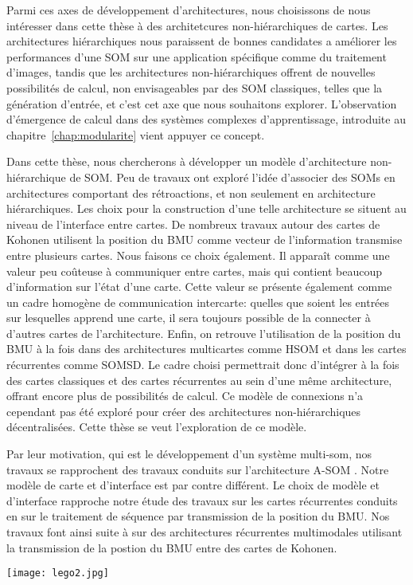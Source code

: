 \documentclass[../main]{subfiles}
\begin{document}
Parmi ces axes de développement d'architectures, nous choisissons de nous intéresser dans cette thèse à des architetcures non-hiérarchiques de cartes.
Les architectures hiérarchiques nous paraissent de bonnes candidates a améliorer les performances d'une SOM sur une application spécifique comme du traitement d'images, tandis que les architectures non-hiérarchiques offrent de nouvelles possibilités de calcul, non envisageables par des SOM classiques, telles que la génération d'entrée, et c'est cet axe que nous souhaitons explorer. L'observation d'émergence de calcul dans des systèmes complexes d'apprentissage, introduite au chapitre~\ref{chap:modularite} vient appuyer ce concept.

Dans cette thèse, nous chercherons à développer un modèle d'architecture non-hiérarchique de SOM. Peu de travaux ont exploré l'idée d'associer des SOMs en architectures comportant des rétroactions, et non seulement en architecture hiérarchiques.
Les choix pour la construction d'une telle architecture se situent au niveau de l'interface entre cartes. De nombreux travaux autour des cartes de Kohonen utilisent la position du BMU comme vecteur de l'information transmise entre plusieurs cartes. 
Nous faisons ce choix également. Il apparaît comme une valeur peu coûteuse à communiquer entre cartes, mais qui contient beaucoup d'information sur l'état d'une carte. Cette valeur se présente également comme un cadre homogène de communication intercarte: quelles que soient les entrées sur lesquelles apprend une carte, il sera toujours possible de la connecter à d'autres cartes de l'architecture. 
Enfin, on retrouve l'utilisation de la position du BMU à la fois dans des architectures multicartes comme HSOM et dans les cartes récurrentes comme SOMSD. Le cadre choisi permettrait donc d'intégrer à la fois des cartes classiques et des cartes récurrentes au sein d'une même architecture, offrant encore plus de possibilités de calcul.
Ce modèle de connexions n'a cependant pas été exploré pour créer des architectures non-hiérarchiques décentralisées. Cette thèse se veut l'exploration de ce modèle.

Par leur motivation, qui est le développement d'un système multi-som, nos travaux se rapprochent des travaux conduits sur l'architecture A-SOM \cite{johnsson_associating_2008, johnsson_associative_2009,gil_sarasom_2015, Buonamente2015DiscriminatingAS}. Notre modèle de carte et d'interface est par contre différent.
Le choix de modèle et d'interface rapproche notre étude des travaux sur les cartes récurrentes conduits en \cite{hagenbuchner_self-organizing_2003,Strickert2003UnsupervisedRS,fix20} sur le traitement de séquence par transmission de la position du BMU.
Nos travaux font ainsi suite à \cite{baheux_towards_2014} sur des architectures récurrentes multimodales utilisant la transmission de la postion du BMU entre des cartes de Kohonen. 

\begin{figure*}[b]
    \centering\texttt{[image: lego2.jpg]}
\end{figure*}

\ifSubfilesClassLoaded{
    \printbibliography
}{}
\end{document}
